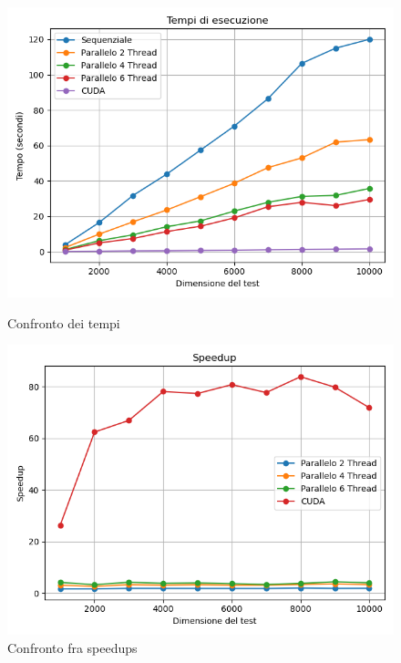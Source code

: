 \documentclass[11pt]{article}
\begin{document}
    \begin{figure}[H]
        \centering
        \begin{minipage}{0.49\textwidth}
            \centering
            \includegraphics[width=\textwidth]{plots/results_times}
            \caption{Confronto dei tempi}\label{fig:tempi}
        \end{minipage}
        \begin{minipage}{0.49\textwidth}
            \centering
            \includegraphics[width=\textwidth]{plots/results_speedup}
            \caption{Confronto fra speedups}\label{fig:speedups}
        \end{minipage}
    \end{figure}
\end{document}
